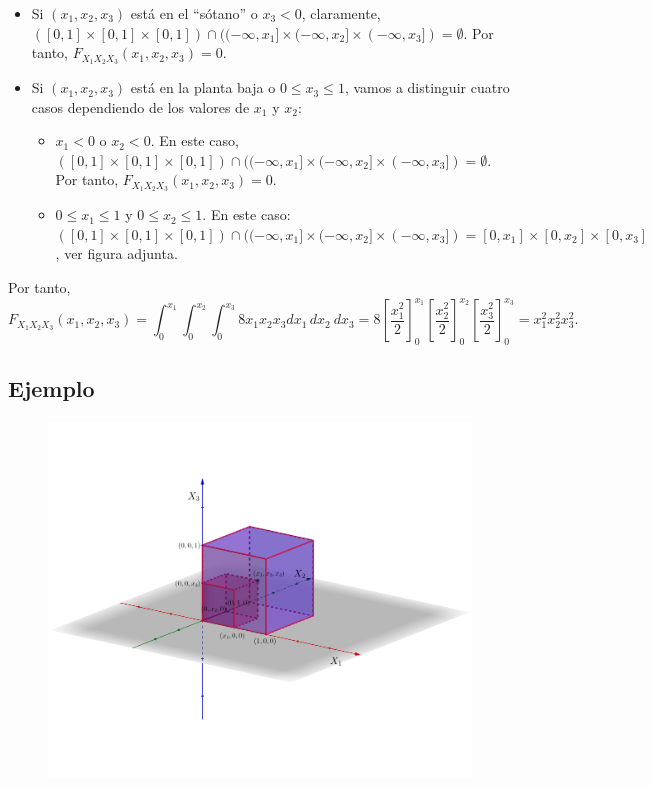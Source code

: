 \documentclass[]{book}
\providecommand{\tightlist}{%
  \setlength{\itemsep}{0pt}\setlength{\parskip}{0pt}}
\begin{document}
\begin{itemize}
\item
  Si \((x_1,x_2,x_3)\) está en el ``sótano'' o \(x_3<0\), claramente, \(([0,1]\times [0,1]\times [0,1])\cap ((-\infty,x_1]\times (-\infty,x_2]\times (-\infty,x_3])=\emptyset\). Por tanto, \(F_{X_1X_2X_3}(x_1,x_2,x_3)=0\).
\item
  Si \((x_1,x_2,x_3)\) está en la planta baja o \(0\leq x_3\leq 1\), vamos a distinguir cuatro casos dependiendo de los valores de \(x_1\) y \(x_2\):

  \begin{itemize}
  \tightlist
  \item
    \(x_1 <0\) o \(x_2 <0\). En este caso, \(([0,1]\times [0,1]\times [0,1])\cap ((-\infty,x_1]\times (-\infty,x_2]\times (-\infty,x_3])=\emptyset\). Por tanto, \(F_{X_1X_2X_3}(x_1,x_2,x_3)=0\).
  \item
    \(0\leq x_1\leq 1\) y \(0\leq x_2\leq 1\). En este caso: \(([0,1]\times [0,1]\times [0,1])\cap ((-\infty,x_1]\times (-\infty,x_2]\times (-\infty,x_3])=[0,x_1]\times [0,x_2]\times [0,x_3]\), ver figura adjunta.
  \end{itemize}
\end{itemize}

Por tanto,
\[
F_{X_1X_2X_3}(x_1,x_2,x_3)=\int_{0}^{x_1}\int_{0}^{x_2}\int_{0}^{x_3} 8 x_1 x_2 x_3 dx_1\, dx_2\ dx_3 = 
8\left[\frac{x_1^2}{2}\right]_0^{x_1}\left[\frac{x_2^2}{2}\right]_0^{x_2}\left[\frac{x_3^2}{2}\right]_0^{x_3} = x_1^2 x_2^2 x_3^2.
\]

\hypertarget{ejemplo-102}{%
\subsection{Ejemplo}\label{ejemplo-102}}

\begin{figure}
\includegraphics[width=800px]{Images/Fx1x2x3bajos} \end{figure}
\end{document}

